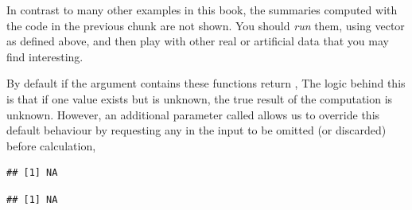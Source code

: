 \documentclass[krantz2]{krantz}\usepackage{knitr}%
\begin{document}
\begin{knitrout}\footnotesize
{}\color{fgcolor}\begin{kframe}
\begin{alltt}
 \hlkwb{<-} \hlopt{:}
\end{alltt}
\end{kframe}
\end{knitrout}

\begin{playground}
  In contrast to many other examples in this book, the summaries computed with the code in the previous chunk are not shown. You should \emph{run} them, using vector  as defined above, and then play with other real or artificial data that you may find interesting.%
\end{playground}

By default if the argument contains  these functions return , The logic behind this is that if one value exists but is unknown, the true result of the computation is unknown. However, an additional parameter called  allows us to override this default behaviour by requesting any  in the input to be omitted (or discarded) before calculation,

\begin{knitrout}\footnotesize
{}\color{fgcolor}\begin{kframe}
\begin{alltt}
 \hlkwb{<-} \hlstd{(}\hlopt{:}\hlstd{,} \hlstd{)}
\end{alltt}
\begin{verbatim}
## [1] NA
\end{verbatim}
\begin{alltt}
  \hlstd{=} \hlstd{)}
\end{alltt}
\begin{verbatim}
## [1] NA
\end{verbatim}
\end{kframe}
\end{knitrout}
\end{document}

